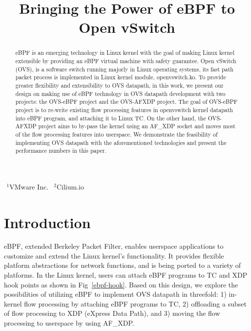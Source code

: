 \documentclass[10pt]{sigplanconf}
\begin{document}
\title{Bringing the Power of eBPF to Open vSwitch}
{
  \(
  \begin{matrix}
    \textrm{$^1$VMware Inc.} & \textrm{$^2$Cilium.io}\\
  \end{matrix}
  \)
}{}

\maketitle

\begin{abstract}
eBPF is an emerging technology in Linux kernel with the goal of making Linux kernel
extensible by providing an eBPF virtual machine with safety guarantee.
Open vSwitch (OVS), is a software switch running majorly in Linux
operating systems, its fast path packet process is implemented in Linux kernel
module, openvswitch.ko.
To provide greater flexibility and extensibility to OVS datapath, in this
work, we present our design on making use of eBPF technology in OVS datapath
development with two projects: the OVS-eBPF project and the OVS-AFXDP project.
The goal of OVS-eBPF project is to re-write existing flow processing features
in openvswitch kernel datapath into eBPF program, and attaching it
to Linux TC.
On the other hand, the OVS-AFXDP project aims to by-pass the kernel
using an AF\_XDP socket and moves most of the flow processing features
into userspace.
We demonstrate the feasibility of implementing OVS datapath with the
aforementioned technologies and present the performance numbers in this paper.
\end{abstract}

\section{Introduction}\label{introduction}

eBPF, extended Berkeley Packet Filter, enables userspace applications to
customize and extend the Linux kernel's functionality. It provides
flexible platform abstractions for network functions, and is being ported
to a variety of platforms. In the Linux kernel, users can attach eBPF programs
to TC and XDP hook points as shown in Fig~\ref{ebpf-hook}. Based on this
design, we explore the possibilities of utilizing eBPF to implement OVS
datapath in threefold:
1) in-kernel flow processing by attaching eBPF programs to TC,
2) offloading a subset of flow processing to XDP (eXpress Data Path),
and 3) moving the flow processing to userspace by using AF\_XDP.
\end{document}
